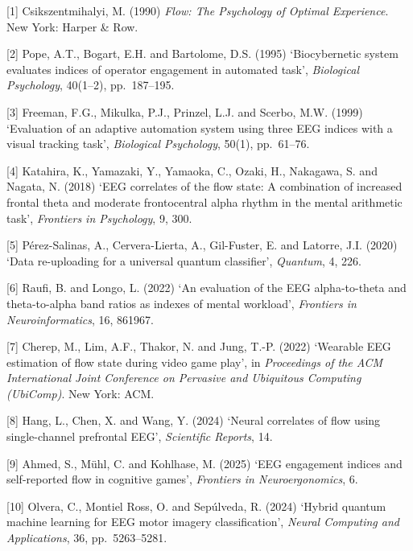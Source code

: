 \documentclass[12pt,a4paper]{article}
\begin{document}
{[}1{]} Csikszentmihalyi, M. (1990) \emph{Flow: The Psychology of Optimal Experience}. New York: Harper \& Row.



{[}2{]} Pope, A.T., Bogart, E.H. and Bartolome, D.S. (1995) `Biocybernetic system evaluates indices of operator engagement in automated task', \emph{Biological Psychology}, 40(1--2), pp.~187--195.



{[}3{]} Freeman, F.G., Mikulka, P.J., Prinzel, L.J. and Scerbo, M.W. (1999) `Evaluation of an adaptive automation system using three EEG indices with a visual tracking task', \emph{Biological Psychology}, 50(1), pp.~61--76.



{[}4{]} Katahira, K., Yamazaki, Y., Yamaoka, C., Ozaki, H., Nakagawa, S. and Nagata, N. (2018) `EEG correlates of the flow state: A combination of increased frontal theta and moderate frontocentral alpha rhythm in the mental arithmetic task', \emph{Frontiers in Psychology}, 9, 300.



{[}5{]} Pérez-Salinas, A., Cervera-Lierta, A., Gil-Fuster, E. and Latorre, J.I. (2020) `Data re-uploading for a universal quantum classifier', \emph{Quantum}, 4, 226.



{[}6{]} Raufi, B. and Longo, L. (2022) `An evaluation of the EEG alpha-to-theta and theta-to-alpha band ratios as indexes of mental workload', \emph{Frontiers in Neuroinformatics}, 16, 861967.



{[}7{]} Cherep, M., Lim, A.F., Thakor, N. and Jung, T.-P. (2022) `Wearable EEG estimation of flow state during video game play', in \emph{Proceedings of the ACM International Joint Conference on Pervasive and Ubiquitous Computing (UbiComp)}. New York: ACM.



{[}8{]} Hang, L., Chen, X. and Wang, Y. (2024) `Neural correlates of flow using single-channel prefrontal EEG', \emph{Scientific Reports}, 14.



{[}9{]} Ahmed, S., Mühl, C. and Kohlhase, M. (2025) `EEG engagement indices and self-reported flow in cognitive games', \emph{Frontiers in Neuroergonomics}, 6.



{[}10{]} Olvera, C., Montiel Ross, O. and Sepúlveda, R. (2024) `Hybrid quantum machine learning for EEG motor imagery classification', \emph{Neural Computing and Applications}, 36, pp.~5263--5281.
\end{document}
